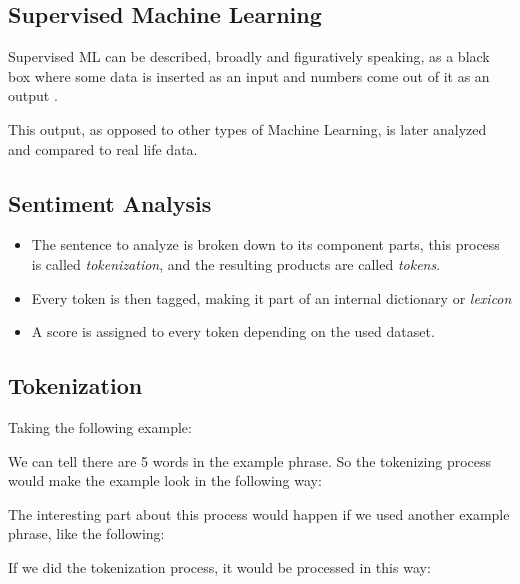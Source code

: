 \documentclass[a4]{sciposter}
\begin{document}
\begin{multicols}{3}
\subsection{Supervised Machine Learning}
Supervised ML can be described, broadly and figuratively speaking, as a black box where some data is inserted as an input and numbers come out of it as an output \citep{rf8}. 

This output, as opposed to other types of Machine Learning, is later analyzed and compared to real life data. \columnbreak

\subsection{Sentiment Analysis}
\begin{itemize}
	\item The sentence to analyze is broken down to its component parts, this process is called \textit{tokenization}, and the resulting products are called \textit{tokens}.
	\item Every token is then tagged, making it part of an internal dictionary or \textit{lexicon}
	\item A score is assigned to every token depending on the used dataset.
\end{itemize}

\subsection{Tokenization}
Taking the following example:
\begin{center}
\end{center}

We can tell there are 5 words in the example phrase. So the tokenizing process would make the example look in the following way:
\begin{center}
\end{center}

The interesting part about this process would happen if we used another example phrase, like the following:
\begin{center}
\end{center}

If we did the tokenization process, it would be processed in this way:
\begin{center}
\end{center}


\end{multicols}
\end{document}
